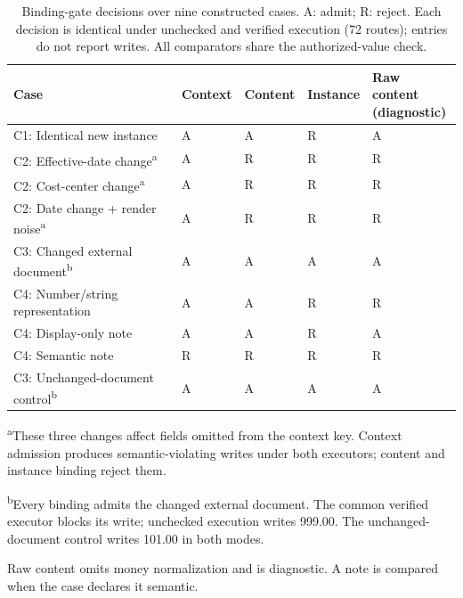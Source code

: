 \begin{table}[tbp]
\caption{Binding-gate decisions over nine constructed cases. A: admit; R: reject. Each decision is identical under unchecked and verified execution (72 routes); entries do not report writes. All comparators share the authorized-value check.}\label{tab:binding-scope}
\centering\footnotesize
\setlength{\tabcolsep}{3pt}
\renewcommand{\arraystretch}{1.12}
\begin{tabularx}{\textwidth}{@{}>{\raggedright\arraybackslash}p{}*{4}{>{\centering\arraybackslash}X}@{}}
\toprule
Case & Context & Content & Instance & \shortstack{Raw content\\(diagnostic)} \\
\midrule
C1: Identical new instance & A & A & R & A \\
C2: Effective-date change\textsuperscript{a} & A & R & R & R \\
C2: Cost-center change\textsuperscript{a} & A & R & R & R \\
C2: Date change + render noise\textsuperscript{a} & A & R & R & R \\
C3: Changed external document\textsuperscript{b} & A & A & A & A \\
C4: Number/string representation & A & A & R & R \\
C4: Display-only note & A & A & R & A \\
C4: Semantic note & R & R & R & R \\
C3: Unchanged-document control\textsuperscript{b} & A & A & A & A \\

\bottomrule
\end{tabularx}
\par\smallskip
\begin{minipage}{\textwidth}\footnotesize\raggedright
\textsuperscript{a}These three changes affect fields omitted from the context key. Context admission produces semantic-violating writes under both executors; content and instance binding reject them.\par
\textsuperscript{b}Every binding admits the changed external document. The common verified executor blocks its write; unchecked execution writes 999.00. The unchanged-document control writes 101.00 in both modes.\par
Raw content omits money normalization and is diagnostic. A note is compared when the case declares it semantic.
\end{minipage}
\end{table}
